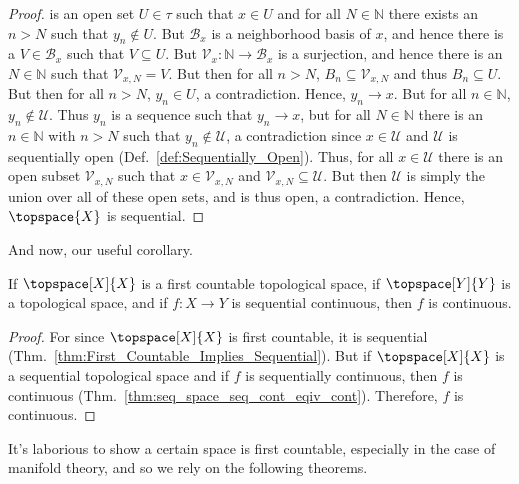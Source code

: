 \documentclass{article}                                                        %
\begin{document}
\begin{proof}
            is an open set $U\in\tau$ such that $x\in{U}$ and for all
            $N\in\mathbb{N}$ there exists an $n>N$ such that $y_{n}\notin{U}$.
            But $\mathcal{B}_{x}$ is a neighborhood basis of $x$, and hence
            there is a $V\in\mathcal{B}_{x}$ such that $V\subseteq{U}$. But
            $\mathcal{V}_{x}:\mathbb{N}\rightarrow\mathcal{B}_{x}$ is a
            surjection, and hence there is an $N\in\mathbb{N}$ such that
            $\mathcal{V}_{x,N}=V$. But then for all $n>N$,
            $B_{n}\subseteq\mathcal{V}_{x,N}$ and thus $B_{n}\subseteq{U}$.
            But then for all $n>N$, $y_{n}\in{U}$, a contradiction. Hence,
            $y_{n}\rightarrow{x}$. But for all $n\in\mathbb{N}$,
            $y_{n}\notin\mathcal{U}$. Thus $y_{n}$ is a sequence such that
            $y_{n}\rightarrow{x}$, but for all $N\in\mathbb{N}$ there is an
            $n\in\mathbb{N}$ with $n>N$ such that $y_{n}\notin\mathcal{U}$, a
            contradiction since $x\in\mathcal{U}$ and $\mathcal{U}$ is
            sequentially open (Def.~\ref{def:Sequentially_Open}). Thus, for all
            $x\in\mathcal{U}$ there is an open subset $\mathcal{V}_{x,N}$ such
            that $x\in\mathcal{V}_{x,N}$ and
            $\mathcal{V}_{x,N}\subseteq\mathcal{U}$. But then $\mathcal{U}$ is
            simply the union over all of these open sets, and is thus open,
            a contradiction. Hence, $\topspace{X}$ is sequential.
        \end{proof}
        And now, our useful corollary.
        \begin{theorem}
            \label{thm:First_Countable_Implies_Seq_Cont_is_Cont}%
            If $\topspace[X]{X}$ is a first countable topological space, if
            $\topspace[Y]{Y}$ is a topological space, and if $f:X\rightarrow{Y}$
            is sequential continuous, then $f$ is continuous.
        \end{theorem}
        \begin{proof}
            For since $\topspace[X]{X}$ is first countable, it is sequential
            (Thm.~\ref{thm:First_Countable_Implies_Sequential}). But if
            $\topspace[X]{X}$ is a sequential topological space and if $f$ is
            sequentially continuous, then $f$ is continuous
            (Thm.~\ref{thm:seq_space_seq_cont_eqiv_cont}). Therefore, $f$ is
            continuous.
        \end{proof}
        It's laborious to show a certain space is first countable, especially in
        the case of manifold theory, and so we rely on the following theorems.
\end{document}
